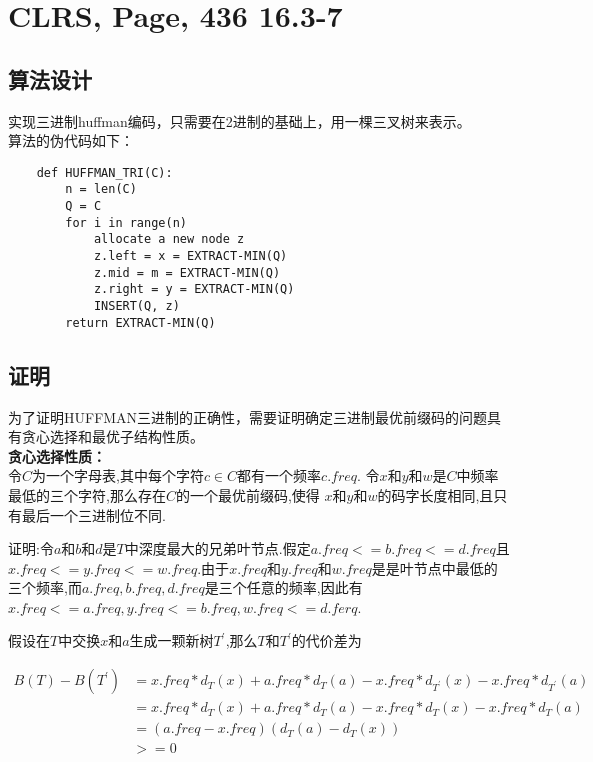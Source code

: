 \documentclass[UTF8]{ctexart}
\begin{document}

\section{CLRS, Page, 436 16.3-7}

\subsection{算法设计}
实现三进制huffman编码，只需要在2进制的基础上，用一棵三叉树来表示。\\
算法的伪代码如下：

\begin{lstlisting}
    def HUFFMAN_TRI(C):
        n = len(C)
        Q = C
        for i in range(n)
            allocate a new node z
            z.left = x = EXTRACT-MIN(Q)
            z.mid = m = EXTRACT-MIN(Q)
            z.right = y = EXTRACT-MIN(Q)
            INSERT(Q, z)
        return EXTRACT-MIN(Q)
 \end{lstlisting}

\subsection{证明}
为了证明HUFFMAN三进制的正确性，需要证明确定三进制最优前缀码的问题具有贪心选择和最优子结构性质。\\

\textbf{贪心选择性质：}\\
令$C$为一个字母表,其中每个字符$c\in C$都有一个频率$c.freq$.
令$x$和$y$和$w$是$C$中频率最低的三个字符,那么存在$C$的一个最优前缀码,使得
$x$和$y$和$w$的码字长度相同,且只有最后一个三进制位不同.

证明:令$a$和$b$和$d$是$T$中深度最大的兄弟叶节点.假定$a.freq<=b.freq<=d.freq$且
$x.freq<=y.freq<=w.freq$.由于$x.freq$和$y.freq$和$w.freq$是是叶节点中最低的
三个频率,而$a.freq,b.freq,d.freq$是三个任意的频率,因此有$x.freq<=a.freq,
y.freq<=b.freq,w.freq<=d.ferq$.

假设在$T$中交换$x$和$a$生成一颗新树$T^\prime$,那么$T$和$T^\prime$的代价差为

\begin{equation*}
	\begin{aligned}
        B(T)-B(T^\prime) &= x.freq*d_T(x)+a.freq*d_T(a)-x.freq*d_{T^\prime}(x)-x.freq*d_{T^\prime}(a) \\
                        &= x.freq*d_T(x)+a.freq*d_T(a)-x.freq*d_{T}(x)-x.freq*d_{T}(a) \\
                        &= (a.freq-x.freq)(d_T(a)-d_T(x)) \\
                        &>=0
	\end{aligned}
\end{equation*}
\end{document}
